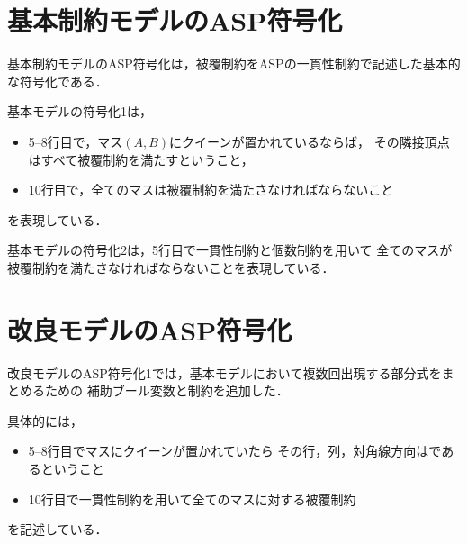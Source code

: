 \section{基本制約モデルのASP符号化}
基本制約モデルのASP符号化は，被覆制約をASPの一貫性制約で記述した基本的な符号化である．



基本モデルの符号化1は，
\begin{itemize}
 \item 5--8行目で，マス$(A,B)$にクイーンが置かれているならば，
  その隣接頂点はすべて被覆制約を満たすということ，
 \item 10行目で，全てのマスは被覆制約を満たさなければならないこと
\end{itemize}
を表現している．




基本モデルの符号化2は，5行目で一貫性制約と個数制約を用いて
全てのマスが被覆制約を満たさなければならないことを表現している．
\section{改良モデルのASP符号化}


改良モデルのASP符号化1では，基本モデルにおいて複数回出現する部分式をまとめるための
補助ブール変数と制約を追加した．

具体的には，
\begin{itemize}
  \item 5--8行目でマスにクイーンが置かれていたら
    その行，列，対角線方向はであるということ
  \item 10行目で一貫性制約を用いて全てのマスに対する被覆制約
\end{itemize}
を記述している．



